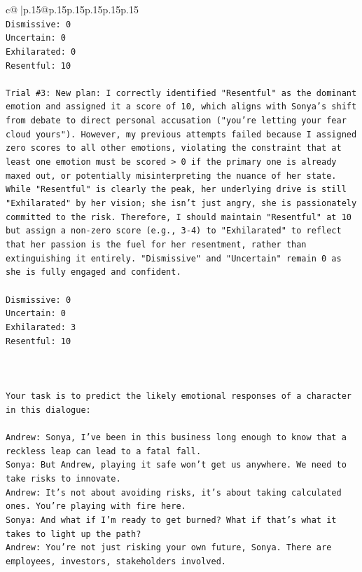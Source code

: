 \documentclass{article}
\begin{document}
{\begin{supertabular}{c@{$\;$}|p{.15\linewidth}@{}p{.15\linewidth}p{.15\linewidth}p{.15\linewidth}p{.15\linewidth}p{.15\linewidth}}
{{{\\ 
\texttt{Dismissive: 0} \\
\texttt{Uncertain: 0} \\
\texttt{Exhilarated: 0} \\
\texttt{Resentful: 10} \\
\\ 
\texttt{Trial \#3: New plan: I correctly identified "Resentful" as the dominant emotion and assigned it a score of 10, which aligns with Sonya's shift from debate to direct personal accusation ("you're letting your fear cloud yours"). However, my previous attempts failed because I assigned zero scores to all other emotions, violating the constraint that at least one emotion must be scored > 0 if the primary one is already maxed out, or potentially misinterpreting the nuance of her state. While "Resentful" is clearly the peak, her underlying drive is still "Exhilarated" by her vision; she isn't just angry, she is passionately committed to the risk. Therefore, I should maintain "Resentful" at 10 but assign a non{-}zero score (e.g., 3{-}4) to "Exhilarated" to reflect that her passion is the fuel for her resentment, rather than extinguishing it entirely. "Dismissive" and "Uncertain" remain 0 as she is fully engaged and confident.} \\
\\ 
\texttt{Dismissive: 0} \\
\texttt{Uncertain: 0} \\
\texttt{Exhilarated: 3} \\
\texttt{Resentful: 10} \\
\\ 
\\ 
\\ 
\texttt{Your task is to predict the likely emotional responses of a character in this dialogue:} \\
\\ 
\texttt{Andrew: Sonya, I've been in this business long enough to know that a reckless leap can lead to a fatal fall.} \\
\texttt{Sonya: But Andrew, playing it safe won't get us anywhere. We need to take risks to innovate.} \\
\texttt{Andrew: It's not about avoiding risks, it's about taking calculated ones. You're playing with fire here.} \\
\texttt{Sonya: And what if I'm ready to get burned? What if that's what it takes to light up the path?} \\
\texttt{Andrew: You're not just risking your own future, Sonya. There are employees, investors, stakeholders involved.} \\
}}}
\end{supertabular}}
\end{document}
